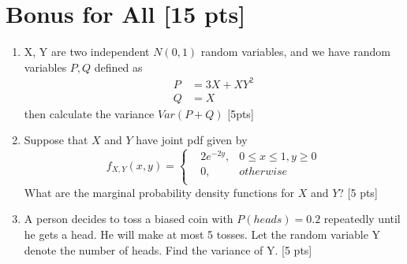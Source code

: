 \documentclass{article}
\begin{document}
\section{Bonus for All [15 pts]}
\begin{enumerate}[label=(\alph*)]
    \item X, Y are two independent $N(0, 1)$ random variables, and we have random variables $P, Q$ defined as 
        \begin{align*}
            P &= 3X + XY^2 \\
            Q &= X
        \end{align*}
        then calculate the variance $Var(P + Q)$ [5pts]
        
    \item Suppose that $X$ and $Y$ have joint pdf given by
        $$f_{X,Y}(x,y)=\left\{
        \begin{aligned}
            &2e^{-2y}, & 0\leq x\leq1,y\geq0 \\
            &0, & otherwise\\
        \end{aligned}\right.$$
    What are the marginal probability density functions for $X$ and  $Y$? [5 pts]

    \item A person decides to toss a biased coin with $P(heads)=0.2$ repeatedly until he gets a head. He will make at most 5 tosses. Let the random variable Y denote the number of heads. Find the variance of Y. [5 pts]
\end{enumerate}
\end{document}
